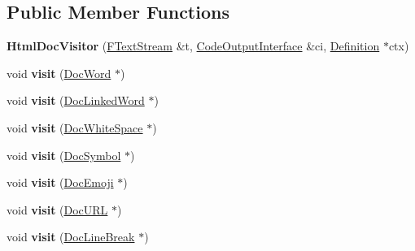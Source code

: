 \subsection*{Public Member Functions}
\begin{DoxyCompactItemize}
\item 
\mbox{\label{class_html_doc_visitor_a8c03fee9956cb45845de0516e34a5cb6}} 
{\bfseries Html\+Doc\+Visitor} (\mbox{\hyperlink{class_f_text_stream}{F\+Text\+Stream}} \&t, \mbox{\hyperlink{class_code_output_interface}{Code\+Output\+Interface}} \&ci, \mbox{\hyperlink{class_definition}{Definition}} $\ast$ctx)
\item 
\mbox{\label{class_html_doc_visitor_abca9a53f6bed1fe8b60ce4cd05ac84ed}} 
void {\bfseries visit} (\mbox{\hyperlink{class_doc_word}{Doc\+Word}} $\ast$)
\item 
\mbox{\label{class_html_doc_visitor_a008d1f60fc1f8b939453e6fff48167cf}} 
void {\bfseries visit} (\mbox{\hyperlink{class_doc_linked_word}{Doc\+Linked\+Word}} $\ast$)
\item 
\mbox{\label{class_html_doc_visitor_ae6005caa36b3ca91535eaab87ad00b7f}} 
void {\bfseries visit} (\mbox{\hyperlink{class_doc_white_space}{Doc\+White\+Space}} $\ast$)
\item 
\mbox{\label{class_html_doc_visitor_a6b8d144af0cd61d46c154b6b962b650e}} 
void {\bfseries visit} (\mbox{\hyperlink{class_doc_symbol}{Doc\+Symbol}} $\ast$)
\item 
\mbox{\label{class_html_doc_visitor_a86f4706d95ff1f6d02477ce44e378e1d}} 
void {\bfseries visit} (\mbox{\hyperlink{class_doc_emoji}{Doc\+Emoji}} $\ast$)
\item 
\mbox{\label{class_html_doc_visitor_aacac6318b77d0ebfd43571ba7251e010}} 
void {\bfseries visit} (\mbox{\hyperlink{class_doc_u_r_l}{Doc\+U\+RL}} $\ast$)
\item 
\mbox{\label{class_html_doc_visitor_aa012479a75447e85dacd53dd7f4fc649}} 
void {\bfseries visit} (\mbox{\hyperlink{class_doc_line_break}{Doc\+Line\+Break}} $\ast$)

\end{DoxyCompactItemize}

